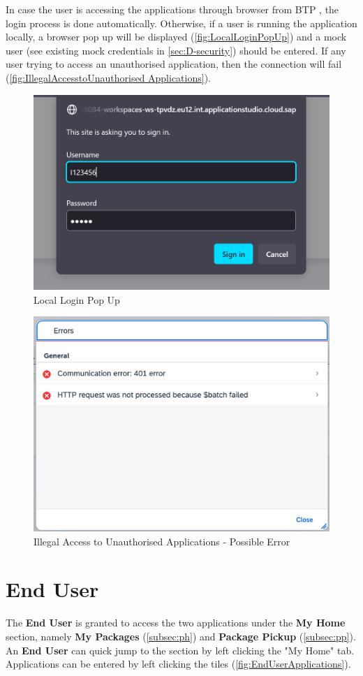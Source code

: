 In case the user is accessing the applications through browser from BTP \cite{btp}, the login process is done automatically. Otherwise, if a user is running the application locally, a browser pop up will be displayed (\autoref{fig:LocalLoginPopUp}) and a mock user (see existing mock credentials in \autoref{sec:D-security}) should be entered.
If any user trying to access an unauthorised application, then the connection will fail (\autoref{fig:IllegalAccesstoUnauthorised Applications}). 

\begin{figure}[H]
	\centering
	\includegraphics[width=0.5\linewidth]{images/user_doc/overviews/localLogin.png}
	\caption{Local Login Pop Up}
	\label{fig:LocalLoginPopUp}
\end{figure}

\begin{figure}[H]
	\centering
	\includegraphics[width=0.5\linewidth]{images/user_doc/overviews/ConnectionError1.png}
	\caption{Illegal Access to Unauthorised Applications - Possible Error}
	\label{fig:IllegalAccesstoUnauthorised Applications}
\end{figure}

\pagebreak

\section{End User}
\label{sec:UdocEndUser}

The \textbf{End User} is granted to access the two applications under the \textbf{My Home} section, namely \textbf{My Packages} (\autoref{subsec:ph}) and \textbf{Package Pickup} (\autoref{subsec:pp}). An \textbf{End User} can quick jump to the section by left clicking the "My Home" tab. Applications can be entered by left clicking the tiles (\autoref{fig:EndUserApplications}).

